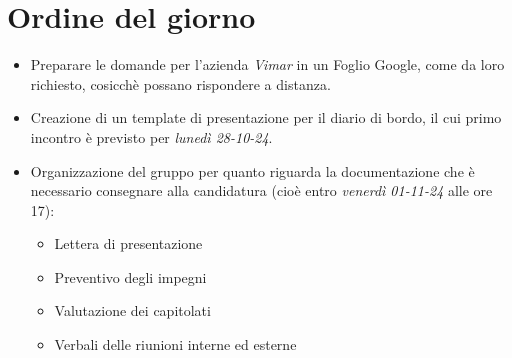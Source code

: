 \section{Ordine del giorno}

\begin{itemize}
    \item Preparare le domande per l'azienda \emph{Vimar} in un Foglio Google, come da loro richiesto, cosicchè possano rispondere a distanza.
    \item Creazione di un template di presentazione per il diario di bordo, il cui primo incontro è previsto per \emph{lunedì 28-10-24}.
    \item Organizzazione del gruppo per quanto riguarda la documentazione che è necessario consegnare alla candidatura (cioè entro \emph{venerdì 01-11-24} alle ore 17):
    \begin{itemize}
        \renewcommand{\labelitemii}{--}
        \item Lettera di presentazione
        \item Preventivo degli impegni
        \item Valutazione dei capitolati
        \item Verbali delle riunioni interne ed esterne
    \end{itemize}
\end{itemize}